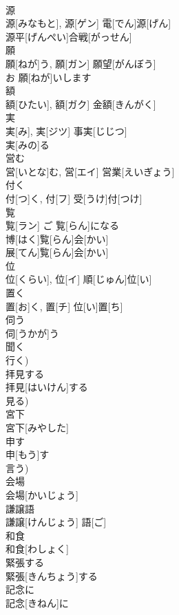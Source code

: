\documentclass[8pt]{extreport}
\begin{document}
\begin{CJK}{UTF8}{min}
\\	源	
\\	源[みなもと], 源[ゲン]	電[でん]源[げん] 
\\	源平[げんぺい]合戦[がっせん] 
\\	願	
\\	願[ねが]う, 願[ガン]	願望[がんぼう] 
\\	お 願[ねが]いします
\\	額	
\\	額[ひたい], 額[ガク]	金額[きんがく] 
\\	実	
\\	実[み], 実[ジツ]	事実[じじつ] 
\\	実[みの]る 
\\	営む	
\\	営[いとな]む, 営[エイ]	営業[えいぎょう] 
\\	付く	
\\	付[つ]く, 付[フ]	受[うけ]付[つけ] 
\\	覧	
\\	覧[ラン]	ご 覧[らん]になる 
\\	博[はく]覧[らん]会[かい] 
\\	展[てん]覧[らん]会[かい] 
\\	位	
\\	位[くらい], 位[イ]	順[じゅん]位[い] 
\\	置く	
\\	置[お]く, 置[チ]	位[い]置[ち] 
\\	伺う	
\\	伺[うかが]う	
\\	聞く 
\\	行く)
\\	拝見する	
\\	拝見[はいけん]する	
\\	見る)
\\	宮下	
\\	宮下[みやした]	
\\	申す	
\\	申[もう]す	
\\	言う)
\\	会場	
\\	会場[かいじょう]	
\\	謙譲語	
\\	謙譲[けんじょう] 語[ご]	
\\	和食	
\\	和食[わしょく]	
\\	緊張する	
\\	緊張[きんちょう]する	
\\	記念に	
\\	記念[きねん]に	

\end{CJK}
\end{document}

